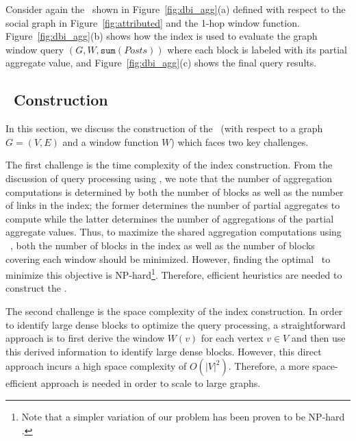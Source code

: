 Consider again the \DBIndex\ shown in Figure~\ref{fig:dbi_agg}(a) 
defined with respect to the social graph in Figure~\ref{fig:attributed} and the 1-hop window function.
Figure~\ref{fig:dbi_agg}(b) shows how the index is used to evaluate the graph window query $(G, W, \mathtt{sum}(Posts))$
where each block is labeled with its partial aggregate value, and Figure~\ref{fig:dbi_agg}(c) shows the final query results.



\subsection{\DBIndex\  Construction} 

In this section, we discuss the construction of the \DBIndex\ (with respect to a graph $G=(V,E)$ and a window function $W$) which faces two key challenges.

The first challenge is the time complexity of the index construction. 
From the discussion of query processing using \DBIndex , 
we note that the number of aggregation computations is determined by both the number of blocks as well as the number of links in the index; 
the former determines the number of partial aggregates to compute
while the latter determines the number of aggregations of the partial aggregate values.
Thus, to maximize the shared aggregation computations using \DBIndex\ , both the number of blocks in the index as well as the number of blocks covering each window should be minimized. 
However, finding the optimal \DBIndex\ to minimize this objective is NP-hard\footnote{
Note that a simpler variation of our problem has been proven to be NP-hard \cite{vassilevska2004finding}.}.
Therefore, efficient heuristics are needed to construct the \DBIndex.

The second challenge is the space complexity of the index construction.
In order to identify large dense blocks to optimize the query processing,
a straightforward approach is to first derive the window $W(v)$ for each vertex $v \in V$ and
then use this derived information to identify large dense blocks.
However, this direct approach incurs a high space complexity of $O(|V|^2)$.
Therefore, a more space-efficient approach is needed in order to scale to large graphs.

